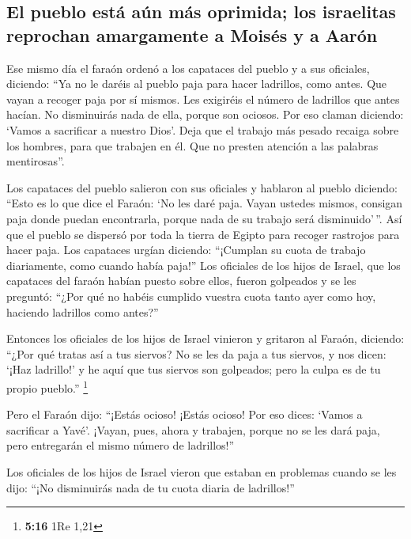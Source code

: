 \begin{paracol}{2}
\hypertarget{el-pueblo-estuxe1-auxfan-muxe1s-oprimida-los-israelitas-reprochan-amargamente-a-moisuxe9s-y-a-aaruxf3n}{%
\subsection{El pueblo está aún más oprimida; los israelitas reprochan
amargamente a Moisés y a
Aarón}\label{el-pueblo-estuxe1-auxfan-muxe1s-oprimida-los-israelitas-reprochan-amargamente-a-moisuxe9s-y-a-aaruxf3n}}

 Ese mismo día el faraón ordenó a los capataces del pueblo
y a sus oficiales, diciendo:  ``Ya no le daréis al pueblo
paja para hacer ladrillos, como antes. Que vayan a recoger paja por sí
mismos.  Les exigiréis el número de ladrillos que antes
hacían. No disminuirás nada de ella, porque son ociosos. Por eso claman
diciendo: `Vamos a sacrificar a nuestro Dios'.  Deja que
el trabajo más pesado recaiga sobre los hombres, para que trabajen en
él. Que no presten atención a las palabras mentirosas''.

 Los capataces del pueblo salieron con sus oficiales y
hablaron al pueblo diciendo: ``Esto es lo que dice el Faraón: `No les
daré paja.  Vayan ustedes mismos, consigan paja donde
puedan encontrarla, porque nada de su trabajo será disminuido'\,''.
 Así que el pueblo se dispersó por toda la tierra de
Egipto para recoger rastrojos para hacer paja.  Los
capataces urgían diciendo: ``¡Cumplan su cuota de trabajo diariamente,
como cuando había paja!''  Los oficiales de los hijos de
Israel, que los capataces del faraón habían puesto sobre ellos, fueron
golpeados y se les preguntó: ``¿Por qué no habéis cumplido vuestra cuota
tanto ayer como hoy, haciendo ladrillos como antes?''

 Entonces los oficiales de los hijos de Israel vinieron y
gritaron al Faraón, diciendo: ``¿Por qué tratas así a tus siervos?
 No se les da paja a tus siervos, y nos dicen: `¡Haz
ladrillo!' y he aquí que tus siervos son golpeados; pero la culpa es de
tu propio pueblo.'' \footnote{\textbf{5:16} 1Re 1,21}

 Pero el Faraón dijo: ``¡Estás ocioso! ¡Estás ocioso! Por
eso dices: `Vamos a sacrificar a Yavé'.  ¡Vayan, pues,
ahora y trabajen, porque no se les dará paja, pero entregarán el mismo
número de ladrillos!''

 Los oficiales de los hijos de Israel vieron que estaban
en problemas cuando se les dijo: ``¡No disminuirás nada de tu cuota
diaria de ladrillos!''


\end{paracol}
